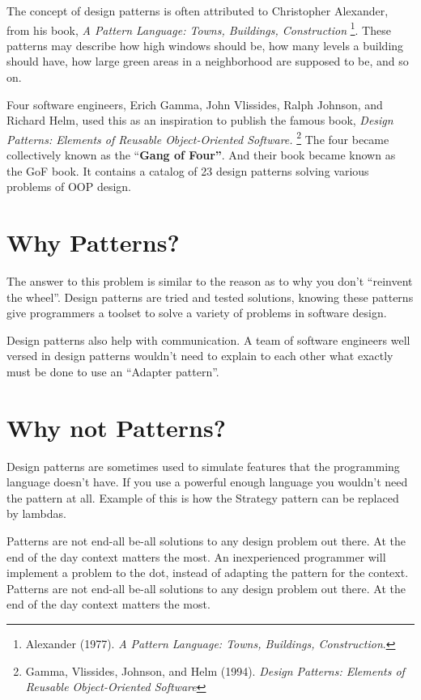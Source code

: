 The concept of design patterns is often attributed to Christopher
Alexander, from his book, \emph{A Pattern Language: Towns, Buildings,
Construction} \footnote{Alexander (1977). \emph{A Pattern Language:
  Towns, Buildings, Construction}.}. These patterns may describe how
high windows should be, how many levels a building should have, how
large green areas in a neighborhood are supposed to be, and so on.

Four software engineers, Erich Gamma, John Vlissides, Ralph Johnson, and
Richard Helm, used this as an inspiration to publish the famous book,
\emph{Design Patterns: Elements of Reusable Object-Oriented Software.}
\footnote{Gamma, Vlissides, Johnson, and Helm (1994). \emph{Design
  Patterns: Elements of Reusable Object-Oriented Software}} The four
became collectively known as the ``\textbf{Gang of Four''}. And their
book became known as the GoF book. It contains a catalog of 23 design
patterns solving various problems of OOP design.

\section{Why
Patterns?}\label{design-patterns-introduction.md__why-patterns}

The answer to this problem is similar to the reason as to why you don't
``reinvent the wheel''. Design patterns are tried and tested solutions,
knowing these patterns give programmers a toolset to solve a variety of
problems in software design.

Design patterns also help with communication. A team of software
engineers well versed in design patterns wouldn't need to explain to
each other what exactly must be done to use an ``Adapter pattern''.

\section{Why not
Patterns?}\label{design-patterns-introduction.md__why-not-patterns}

Design patterns are sometimes used to simulate features that the
programming language doesn't have. If you use a powerful enough language
you wouldn't need the pattern at all. Example of this is how the
Strategy pattern can be replaced by lambdas.

Patterns are not end-all be-all solutions to any design problem out
there. At the end of the day context matters the most. An inexperienced
programmer will implement a problem to the dot, instead of adapting the
pattern for the context. Patterns are not end-all be-all solutions to
any design problem out there. At the end of the day context matters the
most.

